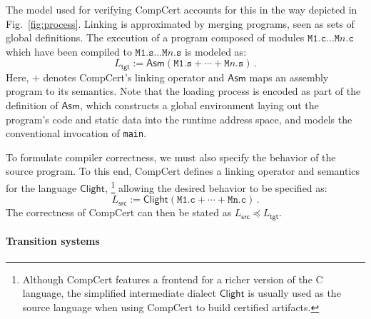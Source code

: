 \documentclass[acmsmall,authordraft]{acmart}
\newcommand{\kw}[1]{\ensuremath{ \mathsf{#1} }}
\newcommand{\refby}{\preceq}
\begin{document}
The model used for verifying CompCert accounts for
this in the way
depicted in Fig.~\ref{fig:process}.
Linking is approximated by
merging programs, seen as sets of global definitions.
The execution
of a program composed of modules
$\texttt{M1.c} \ldots \texttt{M$n$.c}$
which have been compiled to
$\texttt{M1.s} \ldots \texttt{M$n$.s}$
is modeled as:
\[
    L_\kw{tgt} :=
    \kw{Asm}(\texttt{M1.s} +
             \cdots +
             \texttt{M$n$.s}) \,.
\]
Here,
$+$ denotes CompCert's linking operator and
$\kw{Asm}$ maps an assembly program to its semantics.
Note that the loading process is encoded
as part of the definition of $\kw{Asm}$,
which constructs a global environment
laying out the program's code and static data
into the runtime address space,
and models the conventional invocation of \texttt{main}.

To formulate compiler correctness,
we must also specify the behavior of the source program.
To this end,
CompCert defines a linking operator
and semantics
for the language $\kw{Clight}$,%
\footnote{
  Although CompCert features a frontend for a richer version
  of the C language,
  the simplified intermediate dialect \kw{Clight}
  is usually used as the source language
  when using CompCert to build certified artifacts.
}
allowing the desired behavior to be specified as:
\[
    L_\kw{src} :=
    \kw{Clight}(\texttt{M1.c} + \cdots + \texttt{Mn.c}) \,.
\]
The correctness of CompCert
can then be stated as $L_\kw{src} \refby L_\kw{tgt}$.

\paragraph{Transition systems} %
\end{document}
